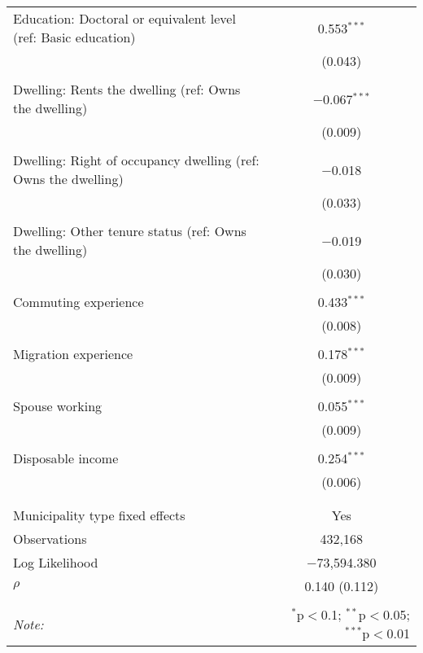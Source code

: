 \begin{table}[!htbp]
\begin{tabular}{@{\extracolsep{5pt}}lc}
 Education: Doctoral or equivalent level (ref: Basic education) & 0.553$^{***}$ \\ 
  & (0.043) \\ 
  & \\ 
 Dwelling: Rents the dwelling (ref: Owns the dwelling) & $-$0.067$^{***}$ \\ 
  & (0.009) \\ 
  & \\ 
 Dwelling: Right of occupancy dwelling (ref: Owns the dwelling) & $-$0.018 \\ 
  & (0.033) \\ 
  & \\ 
 Dwelling: Other tenure status (ref: Owns the dwelling) & $-$0.019 \\ 
  & (0.030) \\ 
  & \\ 
 Commuting experience & 0.433$^{***}$ \\ 
  & (0.008) \\ 
  & \\ 
 Migration experience & 0.178$^{***}$ \\ 
  & (0.009) \\ 
  & \\ 
 Spouse working & 0.055$^{***}$ \\ 
  & (0.009) \\ 
  & \\ 
 Disposable income & 0.254$^{***}$ \\ 
  & (0.006) \\ 
  & \\ 
\hline \\[-1.8ex] 
Municipality type fixed effects & Yes \\ 
Observations & 432,168 \\ 
Log Likelihood & $-$73,594.380 \\ 
$\rho$ & 0.140  (0.112) \\ 
\hline 
\hline \\[-1.8ex] 
\textit{Note:}  & \multicolumn{1}{r}{$^{*}$p$<$0.1; $^{**}$p$<$0.05; $^{***}$p$<$0.01} \\ 
\end{tabular} 
\end{table} 
